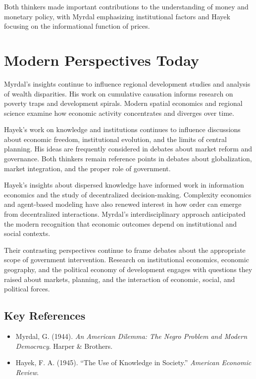 Both thinkers made important contributions to the understanding of money and monetary policy,
with Myrdal emphasizing institutional factors and Hayek focusing on the informational function of
prices.

\section{Modern Perspectives Today}
Myrdal's insights continue to influence regional development studies and analysis of wealth
disparities. His work on cumulative causation informs research on poverty traps and development
spirals. Modern spatial economics and regional science examine how economic activity concentrates
and diverges over time.

Hayek's work on knowledge and institutions continues to influence discussions about economic
freedom, institutional evolution, and the limits of central planning. His ideas are frequently
considered in debates about market reform and governance. Both thinkers remain reference points in
debates about globalization, market integration, and the proper role of government.

Hayek's insights about dispersed knowledge have informed work in information economics and the
study of decentralized decision-making. Complexity economics and agent-based modeling have also
renewed interest in how order can emerge from decentralized interactions. Myrdal's
interdisciplinary approach anticipated the modern recognition that economic outcomes depend on
institutional and social contexts.

Their contrasting perspectives continue to frame debates about the appropriate scope of government
intervention. Research on institutional economics, economic geography, and the political economy
of development engages with questions they raised about markets, planning, and the interaction of
economic, social, and political forces.

\subsection*{Key References}
\begin{itemize}
    \item Myrdal, G. (1944). \textit{An American Dilemma: The Negro Problem and Modern Democracy}.
    Harper \& Brothers.
    \item Hayek, F. A. (1945). ``The Use of Knowledge in Society.''
    \textit{American Economic Review}.
\end{itemize}
